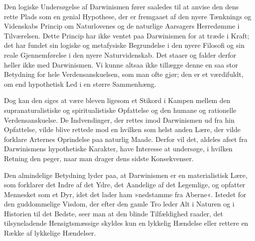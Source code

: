 \documentclass[12pt,a4paper]{article}
\begin{document}
Den logiske Undersøgelse af Darwinismen fører saaledes til at anvise den
dens rette Plads som en genial Hypothese, der er fremgaaet af den nyere
Tænknings og Videnskabs Princip om Naturlovenes og de naturlige Aarsagers
Herredømme i Tilværelsen. Dette Princip har ikke ventet paa Darwinismen
for at træde i Kraft; det har fundet sin logiske og metafysiske Begrundelse
i den nyere Filosofi og sin reale Gjennemførelse i den nyere
Naturvidenskab. Det staaer og falder derfor heller ikke med Darwinismen.
Vi kunne altsaa ikke tillægge denne en saa stor Betydning for hele
Verdensanskuelsen, som man ofte gjør; den er et værdifuldt, om end
hypothetisk Led i en større Sammenhæng.

Dog kan den siges at være bleven ligesom et Stikord i Kampen mellem den
supranaturalistiske og spiritualistiske Opfattelse og den humane og
rationelle Verdensanskuelse. De Indvendinger, der rettes imod Darwinismen
ud fra hin Opfattelse, vilde blive rettede mod en hvilken som helst anden
Lære, der vilde forklare Arternes Oprindelse paa naturlig Maade. Derfor
vil det, aldeles afset fra Darwinismens hypothetiske Karakter, have
Interesse at undersøge, i hvilken Retning den peger, naar man drager dens
sidste Konsekvenser.

Den almindelige Betydning lyder paa, at Darwinismen er en materialistisk
Lære, som forklarer det Indre af det Ydre, det Aandelige af det Legemlige,
og opfatter Mennesket som et Dyr, idet det lader ham »nedstamme fra
Aberne«. Istedet for den guddommelige Visdom, der efter den gamle Tro
leder Alt i Naturen og i Historien til det Bedste, seer man at den blinde
Tilfældighed raader, det tilsyneladende Hensigtsmæssige skyldes kun en
lykkelig Hændelse eller rettere en Række af lykkelige Hændelser.
\end{document}

